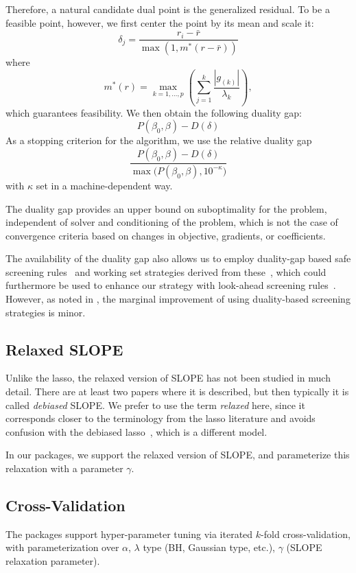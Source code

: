 \documentclass[article]{jss}
\begin{document}
Therefore, a natural candidate dual point is the generalized residual. To be a
feasible point, however, we first center the point by its mean and scale it:
\[
  \delta_j = \frac{r_i - \bar{r}}{\max\left(1, m^*(r - \bar{r}) \right)}
\]
where
\[
  m^*(r) = \max_{k=1,\ldots,p} \left(\sum_{j = 1}^k \frac{|g_{(k)}|}{\lambda_k} \right),
\]
which guarantees feasibility. We then obtain the following duality gap:
\[
  P(\beta_0, \beta) - D(\delta)
\]
As a stopping criterion for the algorithm, we use the relative duality gap
\[
  \frac{P(\beta_0, \beta) - D(\delta)}{\max\big(P(\beta_0, \beta), 10^{-\kappa}\big)}
\]
with \(\kappa\) set in a machine-dependent way.

The duality gap provides an upper bound on suboptimality for the problem, independent
of solver and conditioning of the problem, which is not the case of
convergence criteria based on changes in objective, gradients, or coefficients.

The availability of the duality gap also allows us to employ
duality-gap based safe screening rules~\citep{fercoq2015} and
working set strategies derived from these~\citep{massias2018}, which
could furthermore be used to enhance our strategy with look-ahead
screening rules~\citep{larsson2021a}. However,
as noted in \citet{larsson2022d}, the marginal improvement
of using duality-based screening strategies is minor.

\subsection{Relaxed SLOPE}

Unlike the lasso, the relaxed version of SLOPE has not been studied in much detail.
There are at least two papers where it is described, but then typically it is
called \emph{debiased} SLOPE. We prefer to use the term \emph{relaxed} here,
since it corresponds closer to the terminology from the lasso literature and
avoids confusion with the debiased lasso~\citep{geer2014}, which is a different
model.

In our packages, we support the relaxed version of SLOPE, and parameterize
this relaxation with a parameter \(\gamma\).

\subsection{Cross-Validation}

The packages support hyper-parameter tuning via iterated \(k\)-fold
cross-validation, with parameterization over \(\alpha\), \(\lambda\) type (BH,
Gaussian type, etc.), \(\gamma\) (SLOPE relaxation parameter).
\end{document}
